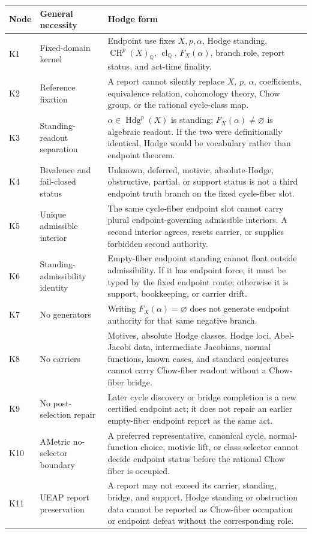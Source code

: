 \documentclass[11pt]{article}
\newcommand{\QQ}{\mathbb{Q}}
\newcommand{\CH}{\operatorname{CH}}
\newcommand{\Hdg}{\operatorname{Hdg}}
\newcommand{\clQ}{\operatorname{cl}_{\QQ}}
\begin{document}
{\small
\begin{longtable}{p{}p{}p{}}
\toprule
Node & General necessity & Hodge form\\
\midrule
\endhead
K1 & Fixed-domain kernel & Endpoint use fixes $X,p,\alpha$, Hodge standing, $\CH^p(X)_\QQ$, $\clQ$, $F_X(\alpha)$, branch role, report status, and act-time finality.\\
K2 & Reference fixation & A report cannot silently replace $X$, $p$, $\alpha$, coefficients, equivalence relation, cohomology theory, Chow group, or the rational cycle-class map.\\
K3 & Standing-readout separation & $\alpha\in\Hdg^p(X)$ is standing; $F_X(\alpha)\neq\varnothing$ is algebraic readout.  If the two were definitionally identical, Hodge would be vocabulary rather than endpoint theorem.\\
K4 & Bivalence and fail-closed status & Unknown, deferred, motivic, absolute-Hodge, obstructive, partial, or support status is not a third endpoint truth branch on the fixed cycle-fiber slot.\\
K5 & Unique admissible interior & The same cycle-fiber endpoint slot cannot carry plural endpoint-governing admissible interiors.  A second interior agrees, resets carrier, or supplies forbidden second authority.\\
K6 & Standing-admissibility identity & Empty-fiber endpoint standing cannot float outside admissibility.  If it has endpoint force, it must be typed by the fixed endpoint route; otherwise it is support, bookkeeping, or carrier drift.\\
K7 & No generators & Writing $F_X(\alpha)=\varnothing$ does not generate endpoint authority for that same negative branch.\\
K8 & No carriers & Motives, absolute Hodge classes, Hodge loci, Abel-Jacobi data, intermediate Jacobians, normal functions, known cases, and standard conjectures cannot carry Chow-fiber readout without a Chow-fiber bridge.\\
K9 & No post-selection repair & Later cycle discovery or bridge completion is a new certified endpoint act; it does not repair an earlier empty-fiber endpoint report as the same act.\\
K10 & AMetric no-selector boundary & A preferred representative, canonical cycle, normal-function choice, motivic lift, or class selector cannot decide endpoint status before the rational Chow fiber is occupied.\\
K11 & UEAP report preservation & A report may not exceed its carrier, standing, bridge, and support.  Hodge standing or obstruction data cannot be reported as Chow-fiber occupation or endpoint defeat without the corresponding role.\\

\end{longtable}}
\end{document}
